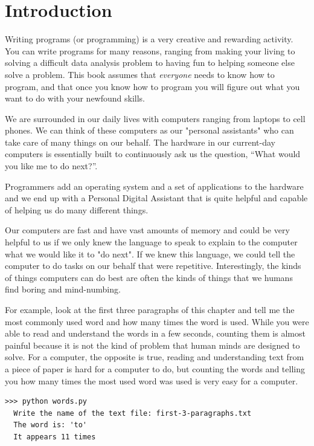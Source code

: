 
\hypertarget{introduction}{%
\section{Introduction}\label{introduction}}

Writing programs (or programming) is a very creative and rewarding activity. You can write programs for many reasons, ranging from making your living to solving a difficult data analysis problem to having fun to helping someone else solve a problem. This book assumes that \emph{everyone} needs to know how to program, and that once you know how to program you will figure out what you want to do with your newfound skills.

We are surrounded in our daily lives with computers ranging from laptops to cell phones. We can think of these computers as our "personal assistants" who can take care of many things on our behalf. The hardware in our current-day computers is essentially built to continuously ask us the question, ``What would you like me to do next?''.

Programmers add an operating system and a set of applications to the hardware and we end up with a Personal Digital Assistant that is quite helpful and capable of helping us do many different things.

Our computers are fast and have vast amounts of memory and could be very helpful to us if we only knew the language to speak to explain to the computer what we would like it to "do next". If we knew this language, we could tell the computer to do tasks on our behalf that were repetitive. Interestingly, the kinds of things computers can do best are often the kinds of things that we humans find boring and mind-numbing.

For example, look at the first three paragraphs of this chapter and tell me the most commonly used word and how many times the word is used. While you were able to read and understand the words in a few seconds, counting them is almost painful because it is not the kind of problem that human minds are designed to solve. For a computer, the opposite is true, reading and understanding text from a piece of paper is hard for a computer to do, but counting the words and telling you how many times the most used word was used is very easy for a computer.

\begin{Verbatim}[frame=single]
>>> python words.py
  Write the name of the text file: first-3-paragraphs.txt
  The word is: 'to'
  It appears 11 times
\end{Verbatim}

